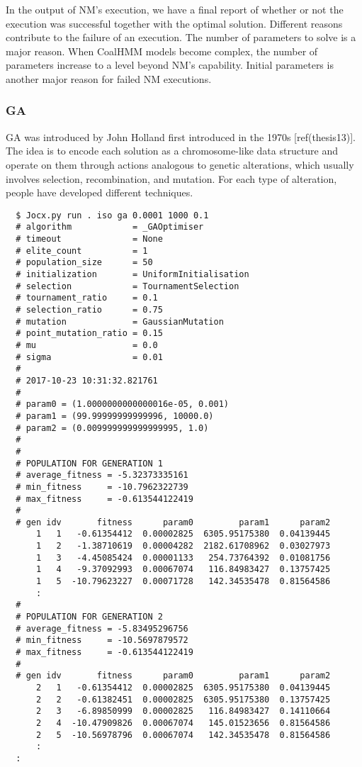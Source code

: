 In the output of NM's execution, we have a final report of whether or not the
execution was successful together with the optimal solution. Different reasons
contribute to the failure of an execution. The number of parameters to solve is
a major reason. When CoalHMM models become complex, the number of parameters
increase to a level beyond NM's capability. Initial parameters is another major
reason for failed NM executions.

\subsubsection{GA}

GA was introduced by John Holland first introduced in the 1970s [ref(thesis13)].
The idea is to encode each solution as a chromosome-like data structure and
operate on them through actions analogous to genetic alterations, which usually
involves selection, recombination, and mutation. For each type of alteration,
people have developed different techniques.

{\small{}\begin{verbatim}
  $ Jocx.py run . iso ga 0.0001 1000 0.1
  # algorithm            = _GAOptimiser
  # timeout              = None
  # elite_count          = 1
  # population_size      = 50
  # initialization       = UniformInitialisation
  # selection            = TournamentSelection
  # tournament_ratio     = 0.1
  # selection_ratio      = 0.75
  # mutation             = GaussianMutation
  # point_mutation_ratio = 0.15
  # mu                   = 0.0
  # sigma                = 0.01
  #
  # 2017-10-23 10:31:32.821761
  #
  # param0 = (1.0000000000000016e-05, 0.001)
  # param1 = (99.99999999999996, 10000.0)
  # param2 = (0.009999999999999995, 1.0)
  #
  #
  # POPULATION FOR GENERATION 1
  # average_fitness = -5.32373335161
  # min_fitness     = -10.7962322739
  # max_fitness     = -0.613544122419
  #
  # gen idv       fitness      param0         param1      param2
      1   1   -0.61354412  0.00002825  6305.95175380  0.04139445
      1   2   -1.38710619  0.00004282  2182.61708962  0.03027973
      1   3   -4.45085424  0.00001133   254.73764392  0.01081756
      1   4   -9.37092993  0.00067074   116.84983427  0.13757425
      1   5  -10.79623227  0.00071728   142.34535478  0.81564586
      :
  #
  # POPULATION FOR GENERATION 2
  # average_fitness = -5.83495296756
  # min_fitness     = -10.5697879572
  # max_fitness     = -0.613544122419
  #
  # gen idv       fitness      param0         param1      param2
      2   1   -0.61354412  0.00002825  6305.95175380  0.04139445
      2   2   -0.61382451  0.00002825  6305.95175380  0.13757425
      2   3   -6.89850999  0.00002825   116.84983427  0.14110664
      2   4  -10.47909826  0.00067074   145.01523656  0.81564586
      2   5  -10.56978796  0.00067074   142.34535478  0.81564586
      :
  :
\end{verbatim}}

